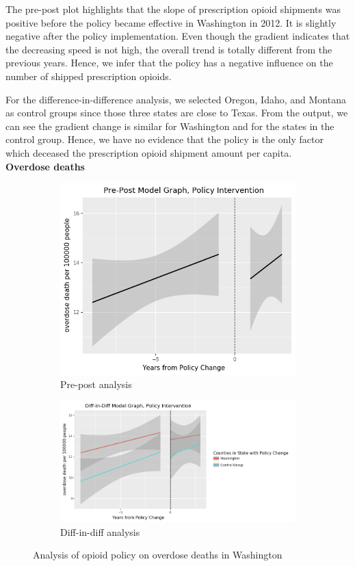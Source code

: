 \documentclass[12pt,letterpaper]{article}
\begin{document}
The pre-post plot highlights that the slope of prescription opioid shipments was positive before the policy became effective in Washington in 2012. It is slightly negative after the policy implementation. Even though the gradient indicates that the decreasing speed is not high, the overall trend is totally different from the previous years. Hence, we infer that the policy has a negative influence on the number of shipped prescription opioids.

For the difference-in-difference analysis, we selected Oregon, Idaho, and Montana as control groups since those three states are close to Texas. From the output, we can see the gradient change is similar for Washington and for the states in the control group. Hence, we have no evidence that the policy is the only factor which deceased the prescription opioid shipment amount per capita. \\

\noindent \textbf{Overdose deaths}

\begin{figure}[!h]
\centering
\begin{subfigure}{.5\textwidth}
  \centering
  \includegraphics[width=0.7\linewidth]{../30_results/General_Results/washington_overdose_death_prepost.png}
  \caption{Pre-post analysis}
  \label{fig:wa_death_prepost}
\end{subfigure}%
\begin{subfigure}{.55\textwidth}
  \centering
  \includegraphics[width=1\linewidth]{../30_results/General_Results/washington_overdose_death_diffdiff.png}
  \caption{Diff-in-diff analysis}
  \label{fig:wa_death_did}
\end{subfigure}
\caption{Analysis of opioid policy on overdose deaths in Washington}
\label{fig:wa_death}
\end{figure}
\end{document}
